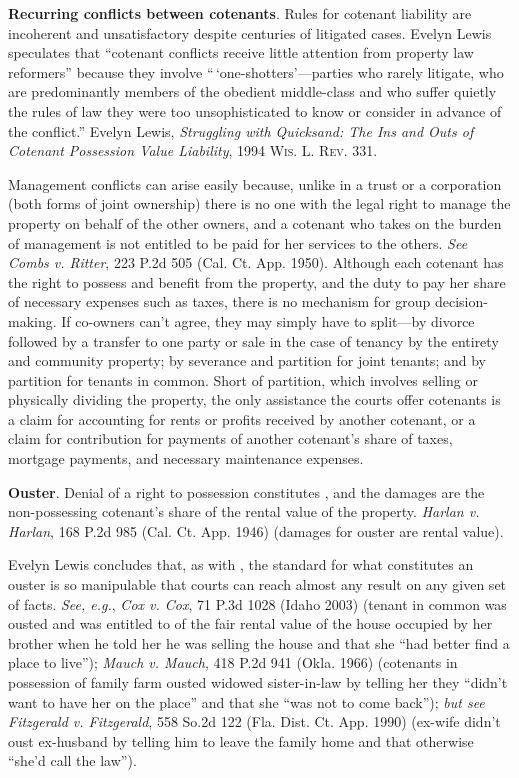 
\item \textbf{Recurring conflicts between cotenants}. Rules for cotenant
liability are incoherent and unsatisfactory despite centuries of litigated
cases. Evelyn Lewis speculates that ``cotenant conflicts receive little
attention from property law reformers'' because they involve
``\,`one-shotters'---parties who rarely litigate, who are predominantly members
of the obedient middle-class and who suffer quietly the rules of law they were
too unsophisticated to know or consider in advance of the conflict.'' Evelyn
Lewis, \textit{Struggling with Quicksand: The Ins and Outs of Cotenant
Possession Value Liability}, 1994 \textsc{Wis. L. Rev}. 331.


Management conflicts can arise easily because, unlike in a trust or a
corporation (both forms of joint ownership) there is no one with the legal
right to manage the property on behalf of the other owners, and a cotenant who
takes on the burden of management is not entitled to be paid for her services
to the others. \emph{See} \emph{Combs v. Ritter}, 223 P.2d 505 (Cal. Ct. App.
1950). Although each cotenant has the right to possess and benefit from the
property, and the duty to pay her share of necessary expenses such as taxes,
there is no mechanism for group decision-making. If co-owners can't agree, they
may simply have to split---by divorce followed by a transfer to one party or
sale in the case of tenancy by the entirety and community property; by severance
and partition for joint tenants; and by partition for tenants in common. Short
of partition, which involves selling or physically dividing the property, the
only assistance the courts offer cotenants is a claim for accounting for rents
or profits received by another cotenant, or a claim for contribution for
payments of another cotenant's share of taxes, mortgage payments, and necessary
maintenance expenses.



\item \textbf{Ouster}. Denial of a right to possession constitutes
, and
the damages are the non-possessing cotenant's share of the rental value of the
property. \emph{Harlan v. Harlan}, 168 P.2d 985 (Cal. Ct. App. 1946) (damages
for ouster are rental value).


Evelyn Lewis concludes that, as with , the standard
for what
constitutes an ouster is so manipulable that courts can reach almost any result
on any given set of facts. \emph{See, e.g.}, \emph{Cox v. Cox}, 71 P.3d 1028
(Idaho 2003) (tenant in common was ousted and was entitled to {\textonehalf} of
the fair rental value of the house occupied by her brother when he told her he
was selling the house and that she ``had better find a place to live'');
\emph{Mauch v. Mauch}, 418 P.2d 941 (Okla. 1966) (cotenants in possession of
family farm ousted widowed sister-in-law by telling her they ``didn't want to
have her on the place'' and that she ``was not to come back''); \emph{but see}
\emph{Fitzgerald v. Fitzgerald}, 558 So.2d 122 (Fla. Dist. Ct. App. 1990)
(ex-wife didn't oust ex-husband by telling him to leave the family home and that
otherwise ``she'd call the law'').


